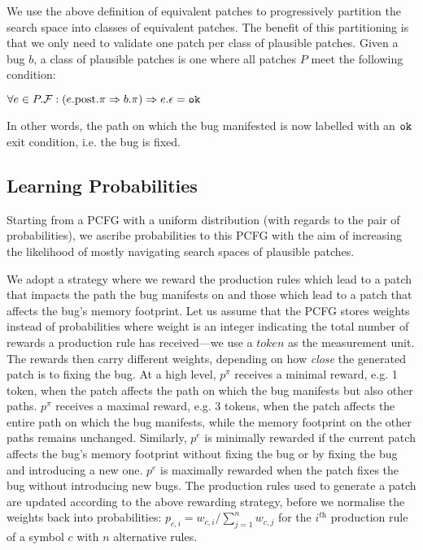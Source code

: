 We use the above definition of equivalent patches to
progressively partition the search space into classes of equivalent patches. 
The benefit of this partitioning is that we only need to validate one
patch per class of plausible patches.
Given a bug $b$, a class of plausible patches is one where all 
patches $P$ meet the following condition:

\centerline{$\forall e \in P.\mathcal{F} : (e.\text{post}.\pi \Rightarrow b.\pi ) \Rightarrow e.\epsilon = \tt{ok}$}
In other words, the path on which the bug manifested 
is now labelled with an $\tt{ok}$ exit condition, i.e. the bug is fixed. 

\subsection{Learning Probabilities}\label{subsec:learnprob}

Starting from a PCFG with a uniform distribution (with regards to the pair of 
probabilities), we ascribe probabilities to this PCFG with the aim of
increasing the likelihood of mostly navigating search spaces of plausible patches. 

We adopt a strategy where we reward the production rules which lead to 
a patch that impacts the path the bug manifests on and those which
lead to a patch that affects the bug's memory footprint.  
%
Let us assume that the PCFG stores weights instead of probabilities
where weight is an integer indicating the total number of rewards a production rule 
 has received---we use a $\textit{token}$ as the measurement unit.
%
The rewards then carry different weights, depending on how \emph{close} the generated 
patch is to fixing the bug. 
%
At a high level,  $ p^\pi$ receives a minimal reward, e.g. 1 token, when the patch affects
the path on which the bug manifests but also other paths. 
$ p^\pi$ receives a maximal reward, e.g. 3 tokens, when the patch affects the entire path on which the bug manifests, while the memory footprint on the other paths remains unchanged.
%
Similarly, $p^e$ is minimally rewarded if the current patch affects the bug's memory footprint without fixing the bug or by fixing the bug and introducing a new one. $p^e$ is maximally rewarded when the patch fixes the bug without introducing new bugs. 
The production rules used to generate a patch are updated according to the above rewarding strategy, before we normalise the weights back into probabilities:
 $p_{c,i} = w_{c,i} / \sum_{j=1}^{n}w_{c,j}$ for the $i^\textit{th}$ production rule of a symbol $c$ with $n$ alternative rules.



